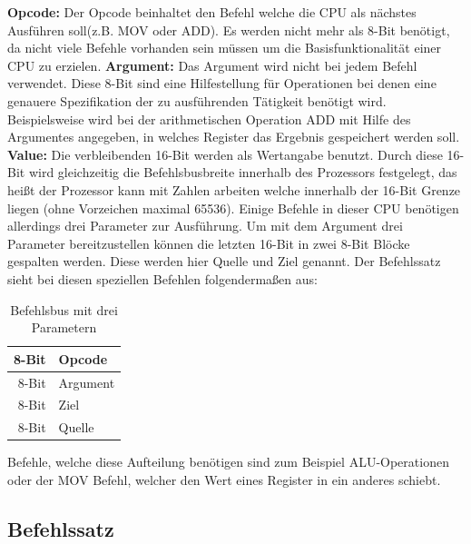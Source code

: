 \documentclass[12pt]{article}
\begin{document}
\indent
\textbf{Opcode: } Der Opcode beinhaltet den Befehl welche die CPU als nächstes Ausführen soll(z.B. MOV oder ADD). Es werden nicht mehr als 8-Bit benötigt, da nicht viele Befehle vorhanden sein müssen um die Basisfunktionalität einer CPU zu erzielen.
\newline
\indent
\textbf{Argument: } Das Argument wird nicht bei jedem Befehl verwendet. Diese 8-Bit sind eine Hilfestellung für Operationen bei denen eine genauere Spezifikation der zu ausführenden Tätigkeit benötigt wird. Beispielsweise wird bei der arithmetischen Operation ADD mit Hilfe des Argumentes angegeben, in welches Register das Ergebnis gespeichert werden soll.
\newline
\indent
\textbf{Value: } Die verbleibenden 16-Bit werden als Wertangabe benutzt. Durch diese 16-Bit wird gleichzeitig die Befehlsbusbreite innerhalb des Prozessors festgelegt, das heißt der Prozessor kann mit Zahlen arbeiten welche innerhalb der 16-Bit Grenze liegen (ohne Vorzeichen maximal 65536). Einige Befehle in dieser CPU benötigen allerdings drei Parameter zur Ausführung. Um mit dem Argument drei Parameter bereitzustellen können die letzten 16-Bit in zwei 8-Bit Blöcke gespalten werden. Diese werden hier Quelle und Ziel genannt. Der Befehlssatz sieht bei diesen speziellen Befehlen folgendermaßen aus: 
\begin{table}[!htb]
\centering
\caption{Befehlsbus mit drei Parametern}
\label{Befehlsbus3P}
\begin{tabular}{|r|l|}
  \hline
  8-Bit & Opcode \\
  \hline
  8-Bit & Argument \\ 
  \hline
  8-Bit & Ziel\\
  \hline
  8-Bit & Quelle\\
  \hline
\end{tabular}
\end{table}
\newline
Befehle, welche diese Aufteilung benötigen sind zum Beispiel ALU-Operationen oder der MOV Befehl, welcher den Wert eines Register in ein anderes schiebt.

\subsection{Befehlssatz}
\end{document}
